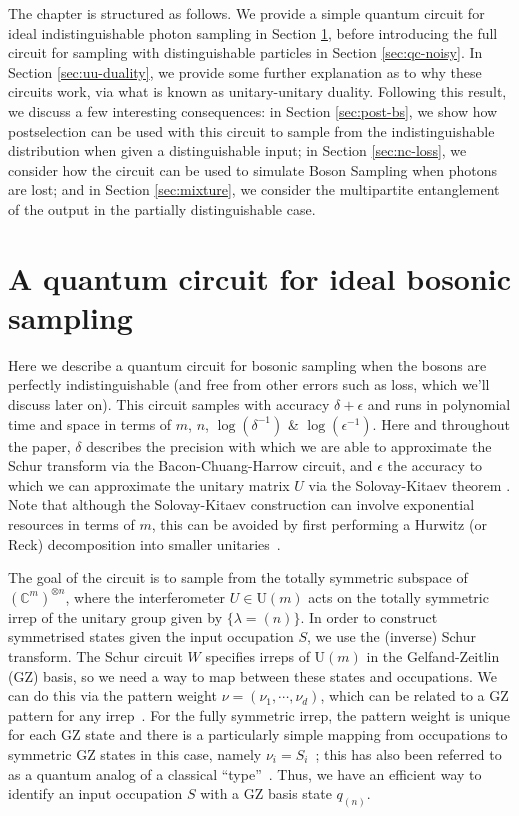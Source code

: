The chapter is structured as follows. 
We provide a simple quantum circuit for ideal indistinguishable photon sampling in Section \ref{sec:qc-bs}, before introducing the full circuit for sampling with distinguishable particles in Section \ref{sec:qc-noisy}. 
In Section \ref{sec:uu-duality}, we provide some further explanation as to why these circuits work, via what is known as unitary-unitary duality.
Following this result, we discuss a few interesting consequences: in Section \ref{sec:post-bs}, we show how postselection can be used with this circuit to sample from the indistinguishable distribution when given a distinguishable input; in Section \ref{sec:nc-loss}, we consider how the circuit can be used to simulate Boson Sampling when photons are lost; and in Section \ref{sec:mixture}, we consider the multipartite entanglement of the output in the partially distinguishable case. 

\section{A quantum circuit for ideal bosonic sampling}
\label{sec:qc-bs}

Here we describe a quantum circuit for bosonic sampling when the bosons are perfectly indistinguishable (and free from other errors such as loss, which we'll discuss later on). 
This circuit samples with accuracy $\delta + \epsilon$ and runs in polynomial time and space in terms of $m$, $n$, $\log(\delta^{-1})$ \& $\log(\epsilon^{-1})$. 
Here and throughout the paper, $\delta$ describes the precision with which we are able to approximate the Schur transform via the Bacon-Chuang-Harrow circuit, and $\epsilon$ the accuracy to which we can approximate the unitary matrix $U$ via the Solovay-Kitaev theorem \cite{nielsen2010,dawson2006}.
Note that although the Solovay-Kitaev construction can involve exponential resources in terms of $m$, this can be avoided by first performing a Hurwitz (or Reck) decomposition into smaller unitaries~\cite{hurwitz1897, reck1994, barenco1995}.

The goal of the circuit is to sample from the totally symmetric subspace of $(\mathbb{C}^m)^{\otimes n}$, where the interferometer $U \in \textrm{U}(m)$ acts on the totally symmetric irrep of the unitary group given by $\{ \lambda = (n)\}$.
In order to construct symmetrised states given the input occupation $S$, we use the (inverse) Schur transform. 
The Schur circuit $W$ specifies irreps of U$(m)$ in the Gelfand-Zeitlin (GZ) basis, so we need a way to map between these states and occupations. 
We can do this via the pattern weight $\nu = (\nu_1,\cdots,\nu_d)$, which can be related to a GZ pattern for any irrep~\cite{alex2011}. 
For the fully symmetric irrep, the pattern weight is unique for each GZ state and there is a particularly simple mapping from occupations to symmetric GZ states in this case, namely $\nu_i = S_i$~\cite{rowe1999}; this has also been referred to as a quantum analog of a classical ``type''~\cite{harrow2005}.
Thus, we have an efficient way to identify an input occupation $S$ with a GZ basis state $q_{(n)}$.

